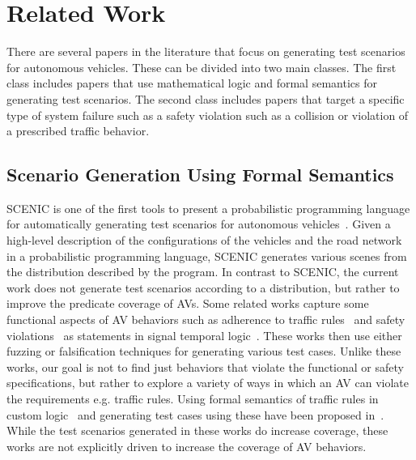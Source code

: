 \section{Related Work}
There are several papers in the literature that focus on generating test scenarios for autonomous vehicles.
% 
These can be divided into two main classes.
% 
The first class includes papers that use mathematical logic and formal semantics for generating test scenarios.
% 
The second class includes papers that target a specific type of system failure such as a safety violation such as a collision or violation of a prescribed traffic behavior.
% 

\subsection{Scenario Generation Using Formal Semantics}
SCENIC is one of the first tools to present a probabilistic programming language for automatically generating test scenarios for autonomous vehicles~\cite{fremont2019scenic}.
% 
Given a high-level description of the configurations of the vehicles and the road network in a probabilistic programming language, SCENIC generates various scenes from the distribution described by the program.
% 
In contrast to SCENIC, the current work does not generate test scenarios according to a distribution, but rather to improve the predicate coverage of AVs.
% 
Some related works capture some functional aspects of AV behaviors such as adherence to traffic rules~\cite{maierhofer2020formalization} and safety violations~\cite{dreossi2019verifai} as statements in signal temporal logic~\cite{tuncali2016utilizing}.
% 
These works then use either fuzzing or falsification techniques for generating various test cases.
% 
Unlike these works, our goal is not to find just behaviors that violate the functional or safety specifications, but rather to explore a variety of ways in which an AV can violate the requirements e.g. traffic rules.
% 
Using formal semantics of traffic rules in custom logic~\cite{Karimi.2020, Bozga.2022} and generating test cases using these have been proposed in~\cite{karimi2022automatic,li2023simulation}.
% 
While the test scenarios generated in these works do increase coverage, these works are not explicitly driven to increase the coverage of AV behaviors.

